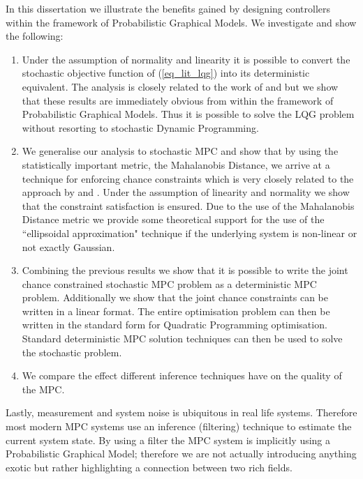 In this dissertation we illustrate the benefits gained by designing controllers within the framework of Probabilistic Graphical Models. We investigate and show the following:
\begin{enumerate}
\item
Under the assumption of normality and linearity it is possible to convert the stochastic objective function of (\ref{eq_lit_lqg}) into its deterministic equivalent. The analysis is closely related to the work of  \cite{yan1} and \cite{yan2} but we show that these results are immediately obvious from within the framework of Probabilistic Graphical Models. Thus it is possible to solve the LQG problem without resorting to stochastic Dynamic Programming.
\item
We generalise our analysis to stochastic MPC and show that by using the statistically important metric, the Mahalanobis Distance, we arrive at a technique for enforcing chance constraints which is very closely related to the approach by \cite{vanhessem2} and \cite{vanhessem1}. Under the assumption of linearity and normality we show that the constraint satisfaction is ensured. Due to the use of the Mahalanobis Distance metric we provide some theoretical support for the use of the ``ellipsoidal approximation" technique if the underlying system is non-linear or not exactly Gaussian.
\item
Combining the previous results we show that it is possible to write the joint chance constrained stochastic MPC problem as a deterministic MPC problem. Additionally we show that the joint chance constraints can be written in a linear format. The entire optimisation problem can then be written in the standard form for Quadratic Programming optimisation. Standard deterministic MPC solution techniques can then be used to solve the stochastic problem.
\item
We compare the effect different inference techniques have on the quality of the MPC.
\end{enumerate}
Lastly, measurement and system noise is ubiquitous in real life systems. Therefore most modern MPC systems use an inference (filtering) technique to estimate the current system state. By using a filter the MPC system is implicitly using a Probabilistic Graphical Model; therefore we are not actually introducing anything exotic but rather highlighting a connection between two rich fields. 

